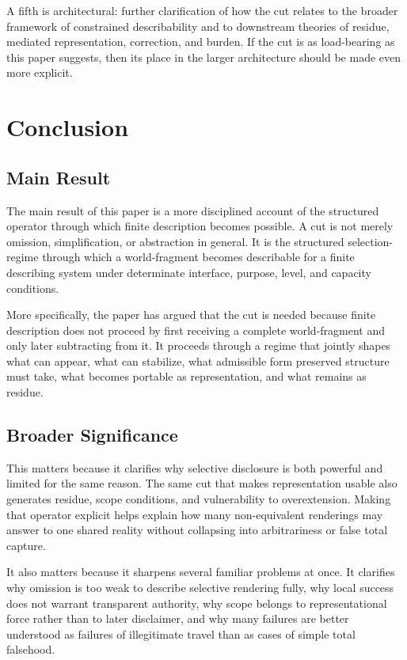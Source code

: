 \documentclass[11pt]{article}
\begin{document}
A fifth is architectural: further clarification of how the cut relates to the broader framework of constrained describability and to downstream theories of residue, mediated representation, correction, and burden. If the cut is as load-bearing as this paper suggests, then its place in the larger architecture should be made even more explicit.

\section{Conclusion}

\subsection{Main Result}

The main result of this paper is a more disciplined account of the structured operator through which finite description becomes possible. A cut is not merely omission, simplification, or abstraction in general. It is the structured selection-regime through which a world-fragment becomes describable for a finite describing system under determinate interface, purpose, level, and capacity conditions.

More specifically, the paper has argued that the cut is needed because finite description does not proceed by first receiving a complete world-fragment and only later subtracting from it. It proceeds through a regime that jointly shapes what can appear, what can stabilize, what admissible form preserved structure must take, what becomes portable as representation, and what remains as residue.

\subsection{Broader Significance}

This matters because it clarifies why selective disclosure is both powerful and limited for the same reason. The same cut that makes representation usable also generates residue, scope conditions, and vulnerability to overextension. Making that operator explicit helps explain how many non-equivalent renderings may answer to one shared reality without collapsing into arbitrariness or false total capture.

It also matters because it sharpens several familiar problems at once. It clarifies why omission is too weak to describe selective rendering fully, why local success does not warrant transparent authority, why scope belongs to representational force rather than to later disclaimer, and why many failures are better understood as failures of illegitimate travel than as cases of simple total falsehood.
\end{document}
